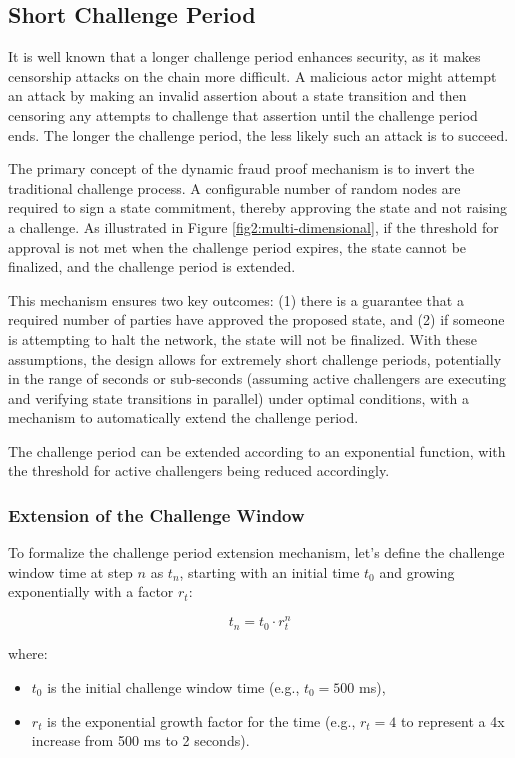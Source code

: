 \documentclass{article}
\begin{document}
\subsection{Short Challenge Period}

It is well known that a longer challenge period enhances security, as it makes censorship attacks on the chain more difficult. A malicious actor might attempt an attack by making an invalid assertion about a state transition and then censoring any attempts to challenge that assertion until the challenge period ends. The longer the challenge period, the less likely such an attack is to succeed.

The primary concept of the dynamic fraud proof mechanism is to invert the traditional challenge process. A configurable number of random nodes are required to sign a state commitment, thereby approving the state and not raising a challenge. As illustrated in Figure \ref{fig2:multi-dimensional}, if the threshold for approval is not met when the challenge period expires, the state cannot be finalized, and the challenge period is extended. 

This mechanism ensures two key outcomes: (1) there is a guarantee that a required number of parties have approved the proposed state, and (2) if someone is attempting to halt the network, the state will not be finalized. With these assumptions, the design allows for extremely short challenge periods, potentially in the range of seconds or sub-seconds (assuming active challengers are executing and verifying state transitions in parallel) under optimal conditions, with a mechanism to automatically extend the challenge period.


The challenge period can be extended according to an exponential function, with the threshold for active challengers being reduced accordingly.

\subsubsection{Extension of the Challenge Window}
To formalize the challenge period extension mechanism, let's define the challenge window time at step \( n \) as \( t_n \), starting with an initial time \( t_0 \) and growing exponentially with a factor \( r_t \):

\[
t_n = t_0 \cdot r_t^n
\]

where:
\begin{itemize}
    \item \( t_0 \) is the initial challenge window time (e.g., \( t_0 = 500 \) ms),
    \item \( r_t \) is the exponential growth factor for the time (e.g., \( r_t = 4 \) to represent a 4x increase from 500 ms to 2 seconds).
\end{itemize}
\end{document}
